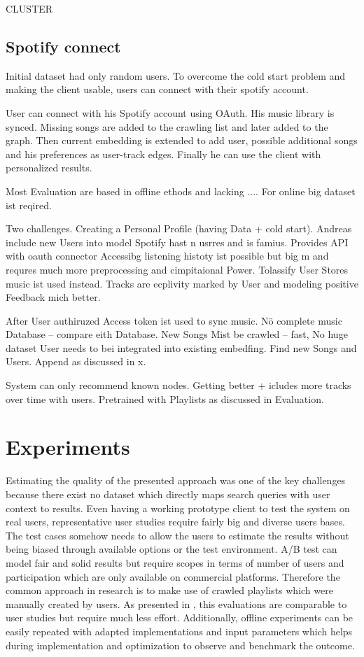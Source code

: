 \documentclass[a4paper]{llncs}
\begin{document}
	CLUSTER
	
	
	\subsection{Spotify connect}
	\label{sec:impl_spotify_connect}
	Initial dataset had only random users. To overcome the cold start problem and making the client usable, users can connect with their spotify account.
	
	User can connect with his Spotify account using OAuth. His music library is synced. Missing songs are added to the crawling list and later added to the graph. Then current embedding is extended to add user, possible additional songs and his preferences as user-track edges.
	Finally he can use the client with personalized results.
	
	
	
	Most Evaluation are based in offline ethods and lacking .... For online big dataset ist reqired. 
	
	Two challenges. Creating a Personal Profile (having Data + cold start). Andreas include new Users into model
	Spotify hast n usrres and is famius. Provides API with oauth connector
	Accessibg listening histoty ist possible but big  m and requres much more preprocessing and cimpitaional Power. 
	Tolassify User Stores music ist used instead. Tracks are ecplivity marked by User and modeling positive Feedback mich better. 
	
	After User authiruzed Access token ist used to sync music. Nö complete music Database -- compare eith Database. New Songs Mist be crawled -- fast, No huge dataset
	User needs to bei integrated into existing embedfing. Find new Songs and Users. Append as discussed in x. 
	
	
	
	System can only recommend known nodes. Getting better + icludes more tracks over time with users. Pretrained with Playlists as discussed in Evaluation. 
	
	\section{Experiments}
	Estimating the quality of the presented approach was one of the key challenges because there exist no dataset which directly maps search queries with user context to results. Even having a working prototype client to test the system on real users, representative user studies require fairly big and diverse users bases. The test cases somehow needs to allow the users to estimate the results without being biased through available options or the test environment. A/B test can model fair and solid results but require scopes in terms of number of users and participation which are only available on commercial platforms. Therefore the common approach in research is to make use of crawled playlists which were manually created by users. As presented in \cite{kamehkhosh2017user}, this evaluations are comparable to user studies but require much less effort. Additionally, offline experiments can be easily repeated with adapted implementations and input parameters which helps during implementation and optimization to observe and benchmark the outcome. \\
	
\end{document}
